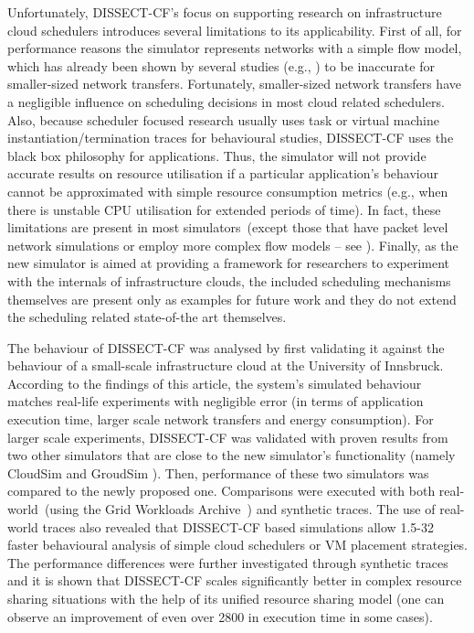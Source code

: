 \documentclass[sort, compress, 5p]{elsarticle}
\begin{document}
Unfortunately, DISSECT-CF's focus on supporting research on infrastructure cloud schedulers introduces several limitations to its applicability. First of all, for performance reasons the simulator represents networks with a simple flow model, which has already been shown by several studies (e.g., \cite{SimGrid-velho2013validity}) to be inaccurate for smaller-sized network transfers. Fortunately, smaller-sized network transfers have a negligible influence on scheduling decisions in most cloud related schedulers. Also, because scheduler focused research usually uses task or virtual machine instantiation/termination traces for behavioural studies, DISSECT-CF uses the black box philosophy for applications. Thus, the simulator will not provide accurate results on resource utilisation if a particular application's behaviour cannot be approximated with simple resource consumption metrics (e.g., when there is unstable CPU utilisation for extended periods of time). In fact, these limitations are present in most simulators~(except those that have packet level network simulations or employ more complex flow models -- see \cite{GreenCloud-5683561, SimGrid-velho2009accuracy}). Finally, as the new simulator is aimed at providing a framework for researchers to experiment with the internals of infrastructure clouds, the included scheduling mechanisms themselves are present only as examples for future work and they do not extend the scheduling related state-of-the art themselves.

The behaviour of DISSECT-CF was analysed by first validating it against the behaviour of a small-scale infrastructure cloud at the University of Innsbruck. According to the findings of this article, the system's simulated behaviour matches real-life experiments with negligible error (in terms of  application execution time, larger scale network transfers and energy consumption). For larger scale experiments, DISSECT-CF was validated with proven results from two other simulators that are close to the new simulator's functionality (namely CloudSim \cite{CloudSim-calheiros2011CloudSim} and GroudSim \cite{GroudSim-ostermann2011groudsim}). Then, performance of these two simulators was compared to the newly proposed one. Comparisons were executed with both real-world~(using the Grid Workloads Archive~\cite{Iosup08thegrid}) and synthetic traces. The use of real-world traces also revealed that DISSECT-CF based simulations allow 1.5-32 faster behavioural analysis of simple cloud schedulers or VM placement strategies. The performance differences were further investigated through synthetic traces and it is shown that DISSECT-CF scales significantly better in complex resource sharing situations with the help of its unified resource sharing model (one can observe an improvement of even over 2800 in execution time in some cases).
\end{document}
